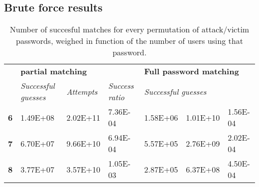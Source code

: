 \documentclass[british,10pt,a4paper]{article}
\begin{document}
\begin{appendices}
	\section{Brute force results}\label{app:bruteforceresults}
	\begin{table}[h]
	\centering
	\begin{tabular}{l|l|l|l|l|l|l|}
	\cline{2-7}
	 & \multicolumn{3}{l|}{\textbf{partial matching}} & \multicolumn{3}{l|}{\textbf{Full password matching}} \\ \cline{2-7} 
	 & \textit{Successful guesses} & \textit{Attempts} & \textit{Success ratio} & \multicolumn{3}{l|}{\textit{Successful guesses}} \\ \hline
	\multicolumn{1}{|l|}{\textbf{6}} & 1.49E+08 & 2.02E+11 & 7.36E-04 & 1.58E+06 & 1.01E+10 & 1.56E-04 \\ \hline
	\multicolumn{1}{|l|}{\textbf{7}} & 6.70E+07 & 9.66E+10 & 6.94E-04 & 5.57E+05 & 2.76E+09 & 2.02E-04 \\ \hline
	\multicolumn{1}{|l|}{\textbf{8}} & 3.77E+07 & 3.57E+10 & 1.05E-03 & 2.87E+05 & 6.37E+08 & 4.50E-04 \\ \hline
	\end{tabular}
	\caption{Number of succesful matches for every permutation of attack/victim passwords, weighed in function of the number of users using that password.}
	\label{tab:brute_force}
	\end{table}

\end{appendices}
\clearpage
\end{document}
